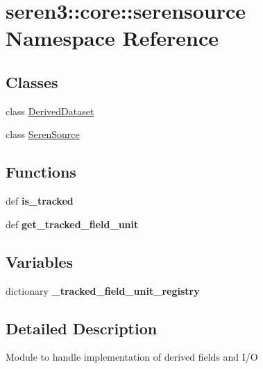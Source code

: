 \hypertarget{namespaceseren3_1_1core_1_1serensource}{
\section{seren3::core::serensource Namespace Reference}
\label{namespaceseren3_1_1core_1_1serensource}
}
\subsection*{Classes}
\begin{DoxyCompactItemize}
\item 
class \hyperlink{classseren3_1_1core_1_1serensource_1_1DerivedDataset}{DerivedDataset}
\item 
class \hyperlink{classseren3_1_1core_1_1serensource_1_1SerenSource}{SerenSource}
\end{DoxyCompactItemize}
\subsection*{Functions}
\begin{DoxyCompactItemize}
\item 
\hypertarget{namespaceseren3_1_1core_1_1serensource_ac46bf64c284dd8a044b0006926ea1ac9}{
def {\bfseries is\_\-tracked}}
\label{namespaceseren3_1_1core_1_1serensource_ac46bf64c284dd8a044b0006926ea1ac9}

\item 
\hypertarget{namespaceseren3_1_1core_1_1serensource_a635e59762898157d176ca64662524748}{
def {\bfseries get\_\-tracked\_\-field\_\-unit}}
\label{namespaceseren3_1_1core_1_1serensource_a635e59762898157d176ca64662524748}

\end{DoxyCompactItemize}
\subsection*{Variables}
\begin{DoxyCompactItemize}
\item 
dictionary {\bfseries \_\-tracked\_\-field\_\-unit\_\-registry}
\end{DoxyCompactItemize}


\subsection{Detailed Description}
\begin{DoxyVerb}
Module to handle implementation of derived fields and I/O
\end{DoxyVerb}
 

